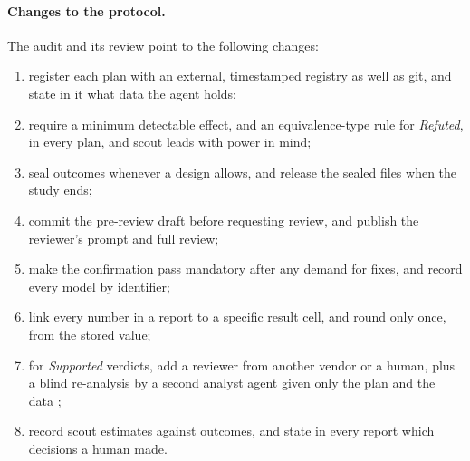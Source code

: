 \paragraph{Changes to the protocol.} The audit and its review point to the following changes:
\begin{enumerate}
\item register each plan with an external, timestamped registry as well as git, and state in it what data the agent
holds;
\item require a minimum detectable effect, and an equivalence-type rule for \emph{Refuted}, in every plan, and scout
leads with power in mind;
\item seal outcomes whenever a design allows, and release the sealed files when the study ends;
\item commit the pre-review draft before requesting review, and publish the reviewer's prompt and full review;
\item make the confirmation pass mandatory after any demand for fixes, and record every model by identifier;
\item link every number in a report to a specific result cell, and round only once, from the stored value;
\item for \emph{Supported} verdicts, add a reviewer from another vendor or a human, plus a blind re-analysis by a
second analyst agent given only the plan and the data \citep{gao2026nse,bertran2026many};
\item record scout estimates against outcomes, and state in every report which decisions a human made.
\end{enumerate}
